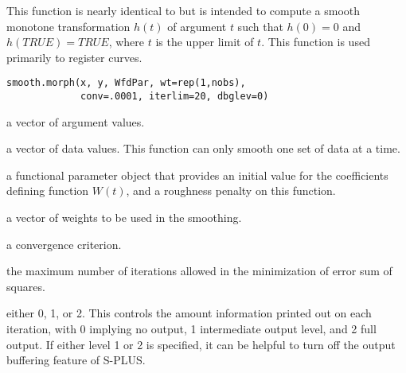 \begin{Description}\relax
This function is nearly identical to  but is
intended to compute a smooth monotone transformation $h(t)$ of
argument $t$ such that $h(0) = 0$ and $h(TRUE) = TRUE$, where $t$ is
the upper limit of $t$.  This function is used primarily to register
curves.
\end{Description}
\begin{Usage}
\begin{verbatim}
smooth.morph(x, y, WfdPar, wt=rep(1,nobs),
             conv=.0001, iterlim=20, dbglev=0)
\end{verbatim}
\end{Usage}
\begin{Arguments}
\begin{ldescription}
\item[\code{x}] a vector of argument values.

\item[\code{y}] a vector of data values.  This function can only smooth one set of
data at a time.

\item[\code{WfdPar}] a functional parameter object that provides an initial value for the
coefficients defining function $W(t)$, and a roughness penalty on
this function.

\item[\code{wt}] a vector of weights to be used in the smoothing.

\item[\code{conv}] a convergence criterion.

\item[\code{iterlim}] the maximum number of iterations allowed in the minimization of
error sum of squares.

\item[\code{dbglev}] either 0, 1, or 2.  This controls the amount information printed out
on each iteration, with 0 implying no output, 1 intermediate output
level, and 2 full output.  If either level 1 or 2 is specified, it
can be helpful to turn off the output buffering feature of S-PLUS.

\end{ldescription}
\end{Arguments}
